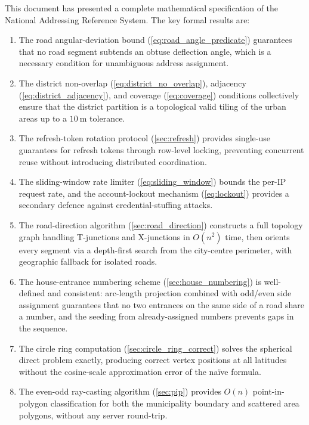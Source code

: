 \documentclass[12pt,a4paper]{article}
\theoremstyle{definition}
\theoremstyle{plain}
\theoremstyle{remark}
\begin{document}
This document has presented a complete mathematical specification of the
National Addressing Reference System. The key formal results are:

\begin{enumerate}
  \item The road angular-deviation bound (\cref{eq:road_angle_predicate})
    guarantees that no road segment subtends an obtuse deflection angle,
    which is a necessary condition for unambiguous address assignment.

  \item The district non-overlap (\cref{eq:district_no_overlap}),
    adjacency (\cref{eq:district_adjacency}), and coverage
    (\cref{eq:coverage}) conditions collectively ensure that the district
    partition is a topological valid tiling of the urban areas up to a
    $10\ \mathrm{m}$ tolerance.

  \item The refresh-token rotation protocol (\cref{sec:refresh}) provides
    single-use guarantees for refresh tokens through row-level locking,
    preventing concurrent reuse without introducing distributed
    coordination.

  \item The sliding-window rate limiter (\cref{eq:sliding_window}) bounds
    the per-IP request rate, and the account-lockout mechanism
    (\cref{eq:lockout}) provides a secondary defence against
    credential-stuffing attacks.

  \item The road-direction algorithm (\cref{sec:road_direction}) constructs
    a full topology graph handling T-junctions and X-junctions in
    $O(n^2)$ time, then orients every segment via a depth-first search
    from the city-centre perimeter, with geographic fallback for isolated
    roads.

  \item The house-entrance numbering scheme (\cref{sec:house_numbering})
    is well-defined and consistent: arc-length projection combined with
    odd/even side assignment guarantees that no two entrances on the
    same side of a road share a number, and the seeding from already-assigned
    numbers prevents gaps in the sequence.

  \item The circle ring computation (\cref{sec:circle_ring_correct}) solves
    the spherical direct problem exactly, producing correct vertex positions
    at all latitudes without the cosine-scale approximation error of the
    na\"ive formula.

  \item The even-odd ray-casting algorithm (\cref{sec:pip}) provides
    $O(n)$ point-in-polygon classification for both the municipality
    boundary and scattered area polygons, without any server round-trip.
\end{enumerate}
\end{document}
